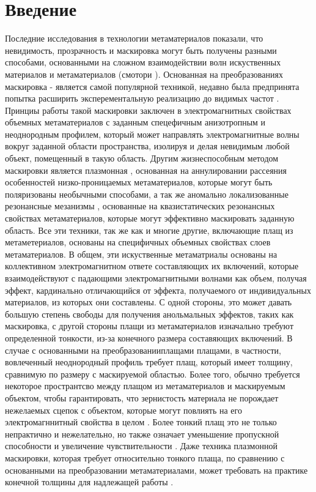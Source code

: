 \documentclass[12pt,a4paper]{article}
\begin{document}
\section{Введение}
Последние исследования в технологии метаматериалов показали, что невидимость,
прозрачность и маскировка могут быть получены разными способами, основанными на
сложном взаимодействии волн искуственных материалов и метаматериалов (смотори 
\cite{1,2}). Основанная на преобразованиях маскировка \cite{3}-\cite{6} является
самой популярной техникой, недавно была предпринята попытка расширить 
эксперементальную реализацию до видимых частот \cite{7}. Принциы работы такой 
маскировки заключен в электромагнитных свойствах объемных метаматериалов с заданным
спецефичным анизотропным и неоднородным профилем, который может направлять 
электромагнитные волны вокруг заданной области пространства, изолируя и делая
невидимым любой объект, помещенный в такую область. Другим жизнеспособным методом
маскировки является плазмонная \cite{8,9}, основанная на аннулировании рассеяния 
особенностей низко-проницаемых метаматериалов, которые могут быть поляризованы 
необычными способами, а так же аномально локализованные резонансные мезанизмы 
\cite{10}, основанные на квазистатических резонансных свойствах метаматериалов, 
которые могут эффективно маскировать заданную область. Все эти техники, так же как
и многие другие, включающие плащ из метаметериалов, основаны на специфичных объемных 
свойствах слоев метаматериалов.
В общем, эти искуственные метаматриалы основаны на коллективном электромагнитном
ответе составляющих их включений, которые взаимодействуют с падающими 
электромагнитными волнами как объем, получая эффект, кардинально отличающийся от
эффекта, получаемого от индивидуальных материалов, из которых они составлены.
С одной стороны, это может давать большую степень свободы для получения анольмальных
эффектов, таких как маскировка, с другой стороны плащи из метаматериалов изначально 
требуют определенной тонкости, из-за конечного размера составяющих включений. 
В случае с основанными на преобразованииплащами плащами, в частности, вовлеченный 
неоднородный профиль требует плащ, который имеет толщину, сравнимую по размеру с 
маскируемой областью. Более того, обычно требуется некоторое пространтсво между
плащом из метаматериалов и маскируемым объектом, чтобы гарантировать, что 
зернистость материала не порождает нежелаемых сцепок с объектом, которые могут 
повлиять на его электромагннитный свойства в целом \cite{11}. Более тонкий плащ
это не только непрактично и нежелательно, но также означает уменьшение пропускной
способности и увеличение чувствительности \cite{12}. Даже техника плазмонной 
маскировки, которая требует относительно тонкого плаща, по сравнению с основанными
на преобразовании метаматериалами, может требовать на практике конечной толщины
для надлежащей работы \cite{11,13}.
\end{document}

